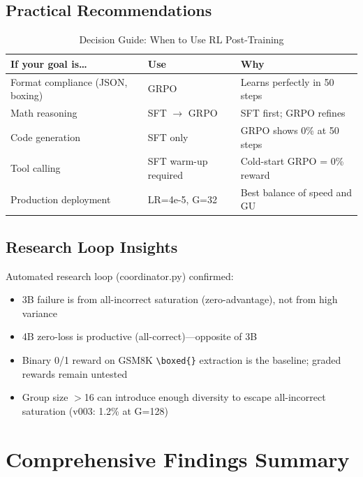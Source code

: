 \documentclass[12pt,a4paper]{report}
\theoremstyle{definition}
\begin{document}
\section{Practical Recommendations}
\label{sec:recommendations}

\begin{table}[htbp]
\centering
\caption{Decision Guide: When to Use RL Post-Training}
\label{tab:decision-guide}
\begin{tabular}{p{4cm}p{4cm}p{5cm}}
\toprule
\textbf{If your goal is\ldots} & \textbf{Use} & \textbf{Why} \\
\midrule
Format compliance (JSON, boxing) & GRPO & Learns perfectly in 50 steps \\
Math reasoning & SFT $\to$ GRPO & SFT first; GRPO refines \\
Code generation & SFT only & GRPO shows 0\% at 50 steps \\
Tool calling & SFT warm-up required & Cold-start GRPO = 0\% reward \\
Production deployment & LR=4e-5, G=32 & Best balance of speed and GU \\
\bottomrule
\end{tabular}
\end{table}

\section{Research Loop Insights}
\label{sec:research-loop}

Automated research loop (coordinator.py) confirmed:
\begin{itemize}[nosep]
\item 3B failure is from all-incorrect saturation (zero-advantage), not from high variance
\item 4B zero-loss is productive (all-correct)---opposite of 3B
\item Binary 0/1 reward on GSM8K \texttt{\textbackslash boxed\{\}} extraction is the baseline; graded rewards remain untested
\item Group size $>$16 can introduce enough diversity to escape all-incorrect saturation (v003: 1.2\% at G=128)
\end{itemize}





\chapter{Comprehensive Findings Summary}
\label{ch:findings-summary}
\end{document}
